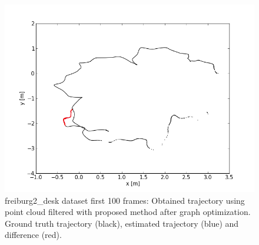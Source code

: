 \begin{figure}[H]
\begin{center}
\includegraphics[scale=0.75]{images/freiburg2_desk_1_100_optimized.png}
\caption{freiburg2\_desk dataset first 100 frames: Obtained trajectory using point cloud filtered with proposed method after graph optimization. Ground truth trajectory (black), estimated trajectory (blue) and difference (red).}
\end{center}
\end{figure}


